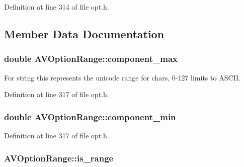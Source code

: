 Definition at line 314 of file opt.\+h.



\subsection{Member Data Documentation}
\subsubsection[{\texorpdfstring{component\+\_\+max}{component_max}}]{\setlength{\rightskip}{0pt plus 5cm}double A\+V\+Option\+Range\+::component\+\_\+max}\hypertarget{struct_a_v_option_range_a120c4beda04930e2e9a51237d99c96c9}{}\label{struct_a_v_option_range_a120c4beda04930e2e9a51237d99c96c9}


For string this represents the unicode range for chars, 0-\/127 limits to A\+S\+C\+II. 



Definition at line 317 of file opt.\+h.

\subsubsection[{\texorpdfstring{component\+\_\+min}{component_min}}]{\setlength{\rightskip}{0pt plus 5cm}double A\+V\+Option\+Range\+::component\+\_\+min}\hypertarget{struct_a_v_option_range_a2f107bb96630be02d4aec9657b24bb3a}{}\label{struct_a_v_option_range_a2f107bb96630be02d4aec9657b24bb3a}


Definition at line 317 of file opt.\+h.

\subsubsection[{\texorpdfstring{is\+\_\+range}{is_range}}]{ A\+V\+Option\+Range\+::is\+\_\+range}\hypertarget{struct_a_v_option_range_afb2f043056ff5fea103f24ba98eafafc}{}\label{struct_a_v_option_range_afb2f043056ff5fea103f24ba98eafafc}


